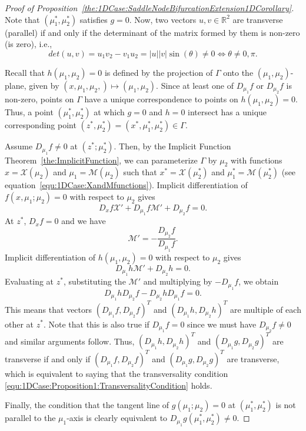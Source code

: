 \documentclass[12pt]{article}
\begin{document}
\begin{proof}[Proof of Proposition~\ref{the:1DCase:SaddleNodeBifurcationExtension1DCorollary}]
    Note that $(\mu_{1}^{*},\mu_{2}^{*})$ satisfies $g=0$. Now, two vectors $u,v\in\mathbb{R}^{2}$ are transverse (parallel) if and only if the determinant of the matrix formed by them is non-zero (is zero), i.e.,
    \[det(u,v)=u_{1}v_{2}-v_{1}u_{2}=|u||v|\sin(\theta)\neq 0 \iff \theta \neq 0,\pi.\]

    Recall that $h(\mu_{1},\mu_{2})=0$ is defined by the projection of $\Gamma$ onto the $(\mu_{1},\mu_{2})$-plane, given by $(x,\mu_{1},\mu_{2},)\mapsto(\mu_{1},\mu_{2})$. Since at least one of $D_{\mu_{1}}f$ or $D_{\mu_{2}}f$ is non-zero, points on $\Gamma$ have a unique correspondence to points on $h(\mu_{1}, \mu_{2})=0$. Thus, a point $(\mu_{1}^{*},\mu_{2}^{*})$ at which $g=0$ and $h=0$ intersect has a unique corresponding point $(z^{*},\mu_{2}^{*})=(x^{*},\mu_{1}^{*}, \mu_{2}^{*})\in\Gamma$.

    Assume $D_{\mu_{1}}f\neq0$ at $(z^{*};\mu_{2}^{*})$. Then, by the Implicit Function Theorem~\ref{the:ImplicitFunction}, we can parameterize $\Gamma$ by $\mu_{2}$ with functions $x=\mathcal{X}(\mu_{2})$ and $\mu_{1}=\mathcal{M}(\mu_{2})$ such that $x^{*}=\mathcal{X}(\mu_{2}^{*})$ and $\mu_{1}^{*}=\mathcal{M}(\mu_{2}^{*})$ (see equation~\eqref{equ:1DCase:XandMfunctions}). Implicit differentiation of $f(x,\mu_{1};\mu_{2})=0$ with respect to $\mu_{2}$ gives
    \[D_{x}f\mathcal{X}'+D_{\mu_{1}}f\mathcal{M}'+D_{\mu_{2}}f=0.\]
    At $z^{*}$, $D_{x}f=0$ and we have
    \[\mathcal{M}'=-\frac{D_{\mu_{2}}f}{D_{\mu_{1}}f}.\]
    Implicit differentiation of $h(\mu_{1},\mu_{2})=0$ with respect to $\mu_{2}$ gives 
    \[D_{\mu_{1}}h\mathcal{M}'+D_{\mu_{2}}h=0.\]
    Evaluating at $z^{*}$, substituting the $\mathcal{M}'$ and multiplying by $-D_{\mu_{1}}f$, we obtain
    \begin{equation*}
        D_{\mu_{1}}hD_{\mu_{2}}f-D_{\mu_{2}}hD_{\mu_{1}}f=0.
    \end{equation*}
    This means that vectors $(D_{\mu_{1}}f,D_{\mu_{2}}f)^{T}$ and $(D_{\mu_{1}}h,D_{\mu_{2}}h)^{T}$ are multiple of each other at $z^{*}$. Note that this is also true if $D_{\mu_{1}}f=0$ since we must have $D_{\mu_{2}}f\neq0$ and similar arguments follow. Thus, $(D_{\mu_{1}}h,D_{\mu_{2}}h)^{T}$ and $(D_{\mu_{1}}g,D_{\mu_{2}}g)^{T}$ are transverse if and only if $(D_{\mu_{1}}f,D_{\mu_{2}}f)^{T}$ and $(D_{\mu_{1}}g,D_{\mu_{2}}g)^{T}$ are transverse, which is equivalent to saying that the transversality condition \eqref{equ:1DCase:Proposition1:TransversalityCondition} holds.

    Finally, the condition that the tangent line of $g(\mu_{1};\mu_{2})=0$ at $(\mu_{1}^{*},\mu_{2}^{*})$ is not parallel to the $\mu_{1}$-axis is clearly equivalent to $D_{\mu_{1}}g(\mu_{1}^{*},\mu_{2}^{*})\neq 0$.
\end{proof}
\end{document}
